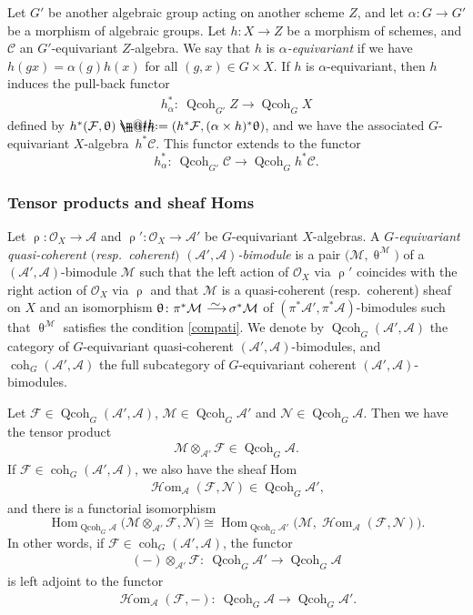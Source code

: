 \documentclass[pdftex]{sigma}%
\makeatletter
\newcommand*{\defeq}{\mathrel{\rlap{%
 \raisebox{0.3ex}{$\m@th\cdot$}}%
 \raisebox{-0.3ex}{$\m@th\cdot$}}%
 =}
\numberwithin{equation}{section}
\newcommand{\Hom}{\operatorname{Hom}}
\newcommand{\cHom}{\operatorname{{\mathcal H}om}}
\newcommand{\coh}{\operatorname{coh}}
\newcommand{\Qcoh}{\operatorname{Qcoh}}
\newcommand{\cA}{\mathcal{A}}
\newcommand{\cC}{\mathcal{C}}
\newcommand{\cF}{\mathcal{F}}
\newcommand{\cM}{\mathcal{M}}
\newcommand{\cN}{\mathcal{N}}
\newcommand{\cO}{\mathcal{O}}
\newcommand{\simto}{\,\,\,\,\raisebox{4pt}{$\sim$}{\kern -1.1em \longrightarrow}\,}
\makeatother
\begin{document}
 Let $G'$ be another algebraic group acting on another scheme $Z$, and let $\alpha\colon G\to G'$ be a morphism of algebraic groups. Let $h\colon X\to Z$ be a morphism of schemes, and $\cC$ an $G'$-equivariant $Z$-algebra. We say that $h$ is {\it $\alpha$-equivariant} if we have $h(g x)=\alpha(g)h(x)$ for all $(g,x)\in G\times X$. If $h$ is $\alpha$-equivariant, then $h$ induces the pull-back functor
\begin{gather*}
h^*_{\alpha}\colon\ \Qcoh_{G'}Z\to \Qcoh_GX
\end{gather*}
defined by $h^*(\cF,\uptheta)\defeq(h^*\cF, (\alpha\times h)^*\uptheta)$, and we have
 the associated $G$-equivariant $X$-alge\-bra~$h^*\cC$. This functor extends to
the functor
\begin{equation*}%
h^*_{\alpha}\colon\ \Qcoh_{G'}\cC\to \Qcoh_Gh^*\cC.
\end{equation*}

\subsubsection{Tensor products and sheaf Homs}

Let $\uprho\colon\cO_{X}\to\cA$ and $\uprho'\colon\cO_{X}\to\cA'$ be $G$-equivariant $X$-algebras. A {\it $G$-equivariant quasi-coherent $($resp.\ coherent$)$ $(\cA',\cA)$-bimodule} is a pair $\big(\cM,\uptheta^{\cM}\big)$ of a $(\cA',\cA)$-bimodule $\cM$ such that the left action of $\cO_{X}$ via $\uprho'$ coincides with the right action of $\cO_{X}$ via $\uprho$ and that $\cM$ is a quasi-coherent (resp.\ coherent) sheaf on $X$ and an isomorphism $\uptheta\colon \pi^*\cM\simto\sigma^*\cM$ of $(\pi^*\cA',\pi^*\cA)$-bimodules such that $\uptheta^{\cM}$ satisfies the condition \eqref{compati}.
 We denote by
$\Qcoh_G(\cA',\cA)$ the category of $G$-equivariant quasi-coherent $(\cA',\cA)$-bimodules, and $\coh_G(\cA',\cA)$ the full subcategory of $G$-equivariant coherent $(\cA',\cA)$-bimodules.


Let $\cF\in \Qcoh_G(\cA',\cA)$, $\cM\in\Qcoh_G\cA'$ and $\cN\in \Qcoh_G\cA$. Then we have the tensor product
\begin{gather*}
\cM\otimes_{\cA'}\cF\in \Qcoh_G\cA.
\end{gather*}
If $\cF\in \coh_G(\cA',\cA)$, we also have the sheaf Hom
\begin{gather*}
\cHom_{\cA}(\cF,\cN)\in \Qcoh_G\cA',
\end{gather*}
and there is a functorial isomorphism
\begin{equation*}%
\Hom_{\Qcoh_G\cA}\big(\cM\otimes_{\cA'}\cF,\cN\big)\cong \Hom_{\Qcoh_G\cA'}\big(\cM,\cHom_{\cA}(\cF,\cN)\big).
\end{equation*}
In other words, if $\cF\in \coh_G(\cA',\cA)$, the functor
\begin{gather*}
(-)\otimes_{\cA'}\cF\colon\ \Qcoh_G\cA'\to\Qcoh_G\cA
\end{gather*}
is left adjoint to the functor
\begin{gather*}
\cHom_{\cA}(\cF,-)\colon\ \Qcoh_G\cA\to\Qcoh_G \cA'.
\end{gather*}
\end{document}
